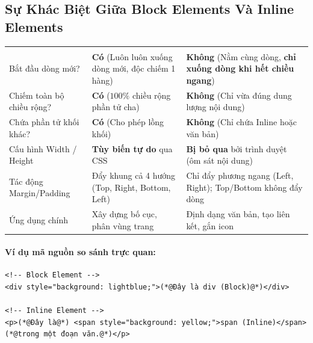 \subsection{Sự Khác Biệt Giữa Block Elements Và Inline Elements}

\begin{prettyTableBox}
\begin{tabularx}{\linewidth}{K{3.5cm} Z Z}
 &  &  \\
Bắt đầu dòng mới? & \textbf{Có} (Luôn luôn xuống dòng mới, độc chiếm 1 hàng) & \textbf{Không} (Nằm cùng dòng, \textbf{chỉ xuống dòng khi hết chiều ngang}) \\
Chiếm toàn bộ chiều rộng? & \textbf{Có} ($100\%$ chiều rộng phần tử cha) & \textbf{Không} (Chỉ vừa đúng dung lượng nội dung) \\
Chứa phần tử khối khác? & \textbf{Có} (Cho phép lồng khối) & \textbf{Không} (Chỉ chứa Inline hoặc văn bản) \\
Cấu hình Width / Height & \textbf{Tùy biến tự do} qua CSS & \textbf{Bị bỏ qua} bởi trình duyệt (ôm sát nội dung) \\
Tác động Margin/Padding & Đẩy khung cả 4 hướng (Top, Right, Bottom, Left) & Chỉ đẩy phương ngang (Left, Right); Top/Bottom không đẩy dòng \\
Ứng dụng chính & Xây dựng bố cục, phân vùng trang & Định dạng văn bản, tạo liên kết, gắn icon \\
\end{tabularx}
\end{prettyTableBox}

\paragraph{Ví dụ mã nguồn so sánh trực quan:}
\begin{codeWindow}
\begin{lstlisting}[language=HTML5]
<!-- Block Element -->
<div style="background: lightblue;">(*@Đây là div (Block)@*)</div>

<!-- Inline Element -->
<p>(*@Đây là@*) <span style="background: yellow;">span (Inline)</span> (*@trong một đoạn văn.@*)</p>
\end{lstlisting}
\end{codeWindow}

